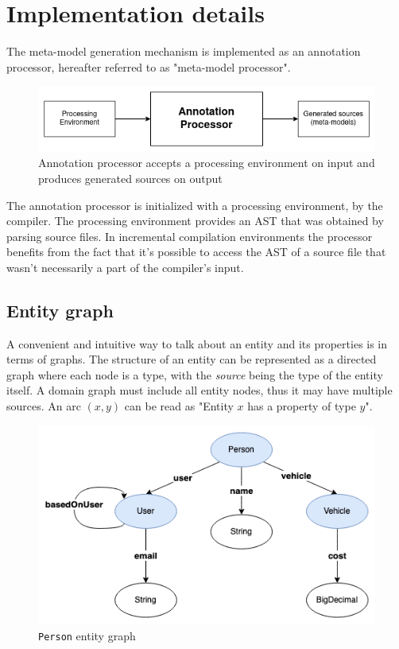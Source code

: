 \chapter{Implementation details}

The meta-model generation mechanism is implemented as an annotation processor, hereafter referred to as "meta-model processor".

\begin{figure}[H]\centering
    \includegraphics[scale=0.65]{images/implement1.drawio.png}
    \caption[Input and output of the annotation processor]{Annotation processor accepts a processing environment on input and produces generated sources on output}\label{fig:implement1}
\end{figure}

The annotation processor is initialized with a processing environment, by the compiler. The processing environment provides an AST that was obtained by parsing source files. In incremental compilation environments the processor benefits from the fact that it’s possible to access the AST of a source file that wasn’t necessarily a part of the compiler’s input.

\section{Entity graph}
A convenient and intuitive way to talk about an entity and its properties is in terms of graphs. The structure of an entity can be represented as a directed graph where each node is a type, with the \textit{source} being the type of the entity itself. A domain graph must include all entity nodes, thus it may have multiple sources.
An arc $(x, y)$ can be read as "Entity $x$ has a property of type $y$". 

\begin{figure}[H]\centering
    \includegraphics[scale=0.65]{images/entity-graph.drawio.png}
    \caption{\texttt{Person} entity graph}\label{fig:entity-graph}
\end{figure}

